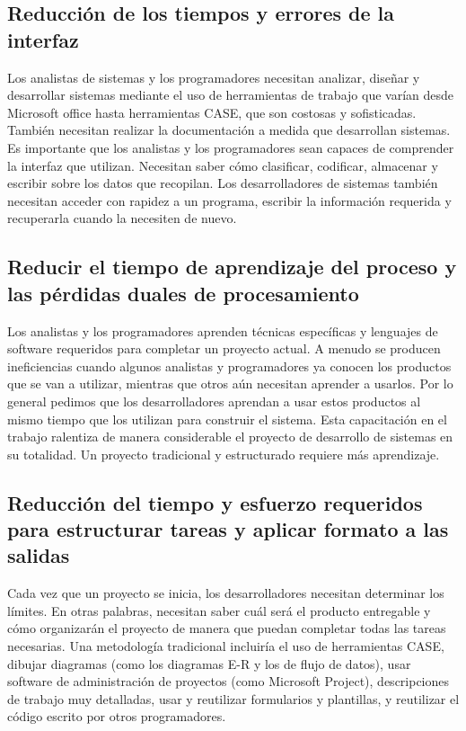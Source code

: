 \subsection{Reducción de los tiempos y errores de la interfaz }
Los analistas de sistemas y los programadores necesitan analizar, diseñar y desarrollar sistemas mediante el uso de herramientas de trabajo que varían desde Microsoft office hasta herramientas CASE, que son costosas y sofisticadas. También necesitan realizar la documentación a medida que desarrollan sistemas. Es importante que los analistas y los programadores sean capaces de comprender la interfaz que utilizan. Necesitan saber cómo clasificar, codificar, almacenar y escribir sobre los datos que recopilan. Los desarrolladores de sistemas también necesitan acceder con rapidez a un programa, escribir la información requerida y recuperarla cuando la necesiten de nuevo.

\subsection{Reducir el tiempo de aprendizaje del proceso y las pérdidas duales de procesamiento }
Los analistas y los programadores aprenden técnicas específicas y lenguajes de software requeridos para completar un proyecto actual. A menudo se producen ineficiencias cuando algunos analistas y programadores ya conocen los productos que se van a utilizar, mientras que otros aún necesitan aprender a usarlos. Por lo general pedimos que los desarrolladores aprendan a usar estos productos al mismo tiempo que los utilizan para construir el sistema. Esta capacitación en el trabajo ralentiza de manera considerable el proyecto de desarrollo de sistemas en su totalidad. Un proyecto tradicional y estructurado requiere más aprendizaje.

\subsection{Reducción del tiempo y esfuerzo requeridos para estructurar tareas y aplicar formato a las salidas  }
Cada vez que un proyecto se inicia, los desarrolladores necesitan determinar los límites. En otras palabras, necesitan saber cuál será el producto entregable y cómo organizarán el proyecto de manera que puedan completar todas las tareas necesarias. Una metodología tradicional incluiría el uso de herramientas CASE, dibujar diagramas (como los diagramas E-R y los de flujo de datos), usar software de administración de proyectos (como Microsoft Project), descripciones de trabajo muy detalladas, usar y reutilizar formularios y plantillas, y reutilizar el código escrito por otros programadores. 

